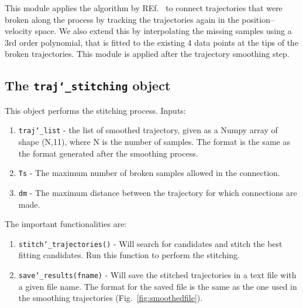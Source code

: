 \documentclass[10pt,a4paper]{article}
\begin{document}
This module applies the algorithm by REf.~\cite{Xu2008} to connect trajectories that were broken along the process by tracking the trajectories again in the position--velocity space. We also extend this by interpolating the missing samples using a 3rd order polynomial, that is fitted to the existing 4 data points at the tips of the broken trajectories. This module is applied after the trajectory smoothing step.




\subsection{The \texttt{traj\char`_stitching} object}

This object performs the stitching process. Inputs:

\begin{enumerate}
	\item \texttt{traj\char`_list} - the list of smoothed trajectory, given as a Numpy array of shape (N,11), where N is the number of samples. The format is the same as the format generated after the smoothing process.
	\item \texttt{Ts} - The maximum number of broken samples allowed in the connection.
	\item \texttt{dm} - The maximum distance between the trajectory for which connections are made.
\end{enumerate}



The important functionalities are:

\begin{enumerate}
	\item \texttt{stitch\char`_trajectories()} - Will search for candidates and stitch the best fitting candidates. Run this function to perform the stitching.  
	\item \texttt{save\char`_results(fname)} - Will save the stitched trajectories in a text file with a given file name. The format for the saved file is the same as the one used in the smoothing trajectories (Fig.~\ref{fig:smoothedfile}).
\end{enumerate}







\end{document}
